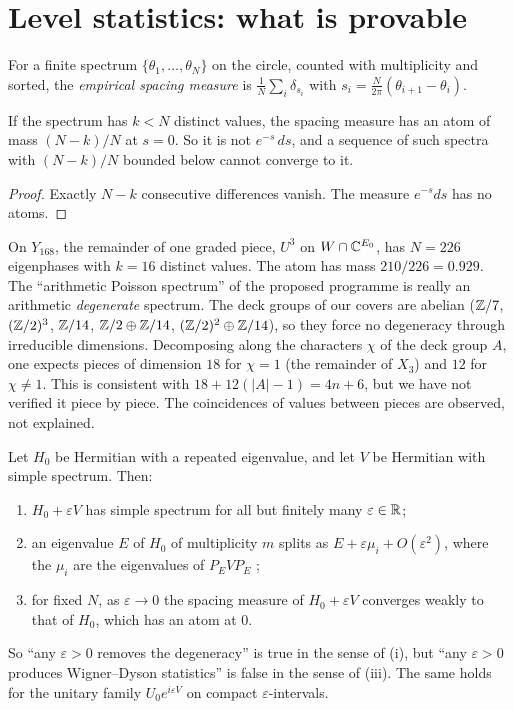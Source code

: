 \section{Level statistics: what is provable}\label{V3P4:sec:stats}

For a finite spectrum $\{\theta_1,\dots,\theta_N\}$ on the circle, counted with multiplicity
and sorted, the \emph{empirical spacing measure} is $\frac1N\sum_i\delta_{s_i}$ with
$s_i=\frac{N}{2\pi}(\theta_{i+1}-\theta_i)$.

\begin{proposition}\label{V3P4:prop:atom}
If the spectrum has $k<N$ distinct values, the spacing measure has an atom of mass $(N-k)/N$ at
$s=0$. So it is not $e^{-s}\,ds$, and a sequence of such spectra with $(N-k)/N$ bounded below
cannot converge to it.
\end{proposition}

\begin{proof}
Exactly $N-k$ consecutive differences vanish. The measure $e^{-s}ds$ has no atoms.
\end{proof}

On $Y_{168}$, the remainder of one graded piece, $U^{3}$ on $W\cap\mathbb{C}^{E_0}$, has $N=226$
eigenphases with $k=16$ distinct values. The atom has mass $210/226=0.929$. The
``arithmetic Poisson spectrum'' of the proposed programme is really an arithmetic
\emph{degenerate} spectrum. The deck groups of our covers are abelian
($\mathbb{Z}/7$, $(\mathbb{Z}/2)^{3}$, $\mathbb{Z}/14$, $\mathbb{Z}/2\oplus\mathbb{Z}/14$, $(\mathbb{Z}/2)^{2}\oplus\mathbb{Z}/14$), so they force no
degeneracy through irreducible dimensions. Decomposing along the characters $\chi$ of the deck
group $A$, one expects pieces of dimension $18$ for $\chi=1$ (the remainder of $X_3$) and $12$
for $\chi\ne1$. This is consistent with $18+12(|A|-1)=4n+6$, but we have not verified it
piece by piece. The coincidences of values between pieces are observed, not explained.

\begin{proposition}\label{V3P4:prop:split}
Let $H_0$ be Hermitian with a repeated eigenvalue, and let $V$ be Hermitian with simple
spectrum. Then:
\begin{enumerate}
\item[(i)] $H_0+\varepsilon V$ has simple spectrum for all but finitely many $\varepsilon\in\mathbb{R}$;
\item[(ii)] an eigenvalue $E$ of $H_0$ of multiplicity $m$ splits as
$E+\varepsilon\mu_i+O(\varepsilon^{2})$, where the $\mu_i$ are the eigenvalues of
$P_EVP_E$ \cite{Kato};
\item[(iii)] for fixed $N$, as $\varepsilon\to0$ the spacing measure of $H_0+\varepsilon V$
converges weakly to that of $H_0$, which has an atom at $0$.
\end{enumerate}
So ``any $\varepsilon>0$ removes the degeneracy'' is true in the sense of (i), but ``any
$\varepsilon>0$ produces Wigner--Dyson statistics'' is false in the sense of (iii). The same holds
for the unitary family $U_0e^{i\varepsilon V}$ on compact $\varepsilon$-intervals.
\end{proposition}

